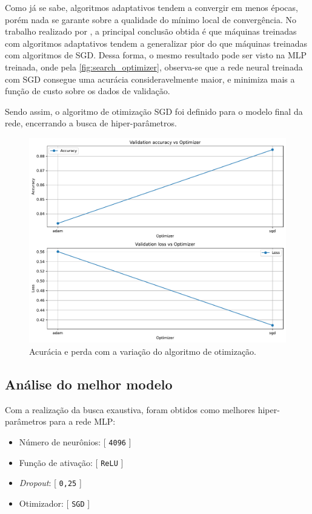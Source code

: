 	Como já se sabe, algoritmos adaptativos tendem a convergir em menos épocas, porém nada se garante sobre a qualidade do mínimo local de convergência. No trabalho realizado por \cite{wilson2018marginal}, a principal conclusão obtida é que máquinas treinadas com algoritmos adaptativos tendem a generalizar pior do que máquinas treinadas com algoritmos de SGD. Dessa forma, o mesmo resultado pode ser visto na MLP treinada, onde pela \autoref{fig:search_optimizer}, observa-se que a rede neural treinada com SGD consegue uma acurácia consideravelmente maior, e minimiza mais a função de custo sobre os dados de validação.
	
	Sendo assim, o algoritmo de otimização SGD foi definido para o modelo final da rede, encerrando a busca de hiper-parâmetros.

\begin{figure}[H]
\centering
\includegraphics[width=0.65\linewidth]{../../plot/mlp/search_optimizer}
\caption{Acurácia e perda com a variação do algoritmo de otimização.}
\label{fig:search_optimizer}
\end{figure}

\subsection{Análise do melhor modelo}

	Com a realização da busca exaustiva, foram obtidos como melhores hiper-parâmetros para a rede MLP: 
	
	\begin{itemize}
		\item Número de neurônios: [ \texttt{4096} ]
		\item Função de ativação: [ \texttt{ReLU} ]
		\item \textit{Dropout}: [ \texttt{0,25} ]
		\item Otimizador: [ \texttt{SGD} ]
	\end{itemize} 


